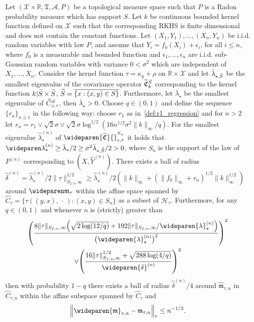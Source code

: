 \documentclass[AHL,Unicode,longabstracts,published]{cedram}
\theoremstyle{remark}
\newcommand{\restrr}
{\!\!\upharpoonright\!\!}
\newcommand{\R}{\mathbb{R}}
\newcommand{\X}{\mathcal{X}}
\newcommand{\clA}{\mathcal{A}}
\newcommand{\cH}{\mathcal{H}}
\newcommand{\fkC}{\mathfrak{C}}
\newcommand{\fkT}{\mathfrak{T}}
\newcommand{\Cov}{\tilde{\fkC}}
\newcommand{\mean}{\mathfrak{m}}
\newcommand{\CovCapntau}{\wideparen{\widetilde{\fkC}}{\vphantom{\fkC}}^{S_n}_{c,\tau}}
\let\oldtilde\tilde
\renewcommand*{\tilde}[1]{\mathchoice{\widetilde{#1}}{\widetilde{#1}}{\oldtilde{#1}}{\oldtilde{#1}}}
\let\originalleft\left
\let\originalright\right
\renewcommand{\left}{\mathopen{}\mathclose\bgroup\originalleft}
\renewcommand{\right}{\aftergroup\egroup\originalright}
\begin{document}
\begin{prop}\label{prop:regression_ball}
Let $(\X \times \R, \fkT, \clA,P)$ be a topological measure space such that $P$ is a Radon probability measure which has support $S$. Let $k$ be continuous bounded kernel function defined on $\X$ such that the corresponding RKHS is finite dimensional and does not contain the constant functions. Let $(X_1,Y_1), \dots, (X_n,Y_n)$ be i.i.d. random variables with law $P$, and assume that $Y_i = f_0(X_i) + \epsilon_i$, for all $i \leq n$, where $f_0$ is a measurable and bounded function and $\epsilon_1,\dots, \epsilon_n$ are i.i.d. sub-Gaussian random variables with variance $0 < \sigma^2$ which are independent of $X_1,\dots, X_n$. Consider the kernel function $\tau = \kappa_y + \rho$ on $\R \times \X$ and let $\bar \lambda_{\star,\tilde S}$ be the smallest eigenvalue of the covariance operator $\Cov^{\tilde S}_k$ corresponding to the kernel function $k\restrr \tilde S \times \tilde S$, $\tilde S = \overline{\{x: (x,y) \in S\}}$. Furthermore, let $\bar \lambda_\star$ be the smallest eigenvalue of $\tilde C_{c,\tau}^S$, then $\bar \lambda_\star>0$. Choose $q \in (0,1)$ and define the sequence $\{r_n\}_{n\geq 1}$ in the following way: choose $r_1$ as in~\eqref{def:r1_regression} and for $n >2$ let $r_n = r_1 \vee\sqrt{2} \sigma \vee \sqrt{2} \sigma \log^{1/2}(16 n^{1/2} \sigma^2 \|k\|_\infty/ q) $. For the smallest eigenvalue $\wideparen \lambda_{\star}^{(n)}$ of $\CovCapntau$ it holds that $\wideparen \lambda_{\star}^{(n)} \geq \bar \lambda_\star/2 \geq \sigma^2 \bar \lambda_{\star,\tilde S}/2 > 0$, where $S_n$ is the support of the law of $P^{(n)}$ corresponding to $(X,\wideparen{Y}^{(n)})$. There exists a ball of radius $\wideparen \delta^{(n)} = \wideparen \lambda_{\star}^{(n)} / 2 \|\tau \|_{S_{f,n},\infty}^{1/2} \geq \wideparen \lambda_{\star}^{(n)} / 2 (\|k\|_\infty + (\|f_0\|_\infty + r_n)^{1/2} \|k\|_\infty^{1/2})$ around $\wideparen \mean_\tau$ within the affine space spanned by $\wideparen{C}_\tau = \{ \tau((y,x),\,\cdot\,) : (x,y) \in S_n\}$ as a subset of $\cH_\tau$. Furthermore, for any $q \in (0,1)$ and whenever $n$ is (strictly) greater than
\begin{multline*}
\left(
\frac{8 \|\tau\|_{S_{f,n},\infty} \left(\sqrt{2\log(12/q)} + 192\|\tau\|_{S_{f,n},\infty} /\wideparen{\lambda}_\star^{(n)}\right)}{\bigl(\wideparen{\lambda}_\star^{(n)}\bigr)^2} \right)^{2}\\ 
\vee
\left(\frac{16\|\tau\|_{S_{f,n},\infty}^{1/2} + \sqrt{288\log(4/q)}}{\wideparen{\delta}^{(n)}}\right)^{2}
\end{multline*}
then with probability $1-q$ there exists a ball of radius $\wideparen \delta^{(n)}/4$ around $\wideparen{\mean}_{\tau,n}$ in $\wideparen{C}_{\tau,n}$ within the affine subspace spanned by $\wideparen{C}_\tau$ and
\[
\left\|\wideparen{\mean}_{\tau,n} - \mean_{\tau,n}\right\|_\tau \leq n^{-1/2}.
\]
\end{prop}
\end{document}
